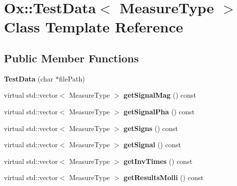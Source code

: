 \hypertarget{class_ox_1_1_test_data}{\section{Ox\-:\-:Test\-Data$<$ Measure\-Type $>$ Class Template Reference}
\label{class_ox_1_1_test_data}
}
\subsection*{Public Member Functions}
\begin{DoxyCompactItemize}
\item 
\hypertarget{class_ox_1_1_test_data_add19d13b8ec2404fc5d6ebf4ee79a231}{{\bfseries Test\-Data} (char $\ast$file\-Path)}\label{class_ox_1_1_test_data_add19d13b8ec2404fc5d6ebf4ee79a231}

\item 
\hypertarget{class_ox_1_1_test_data_a4e75699c035937ff96fa131505870208}{virtual std\-::vector$<$ Measure\-Type $>$ {\bfseries get\-Signal\-Mag} () const }\label{class_ox_1_1_test_data_a4e75699c035937ff96fa131505870208}

\item 
\hypertarget{class_ox_1_1_test_data_a287f28ddb03f9acc694528441b57c375}{virtual std\-::vector$<$ Measure\-Type $>$ {\bfseries get\-Signal\-Pha} () const }\label{class_ox_1_1_test_data_a287f28ddb03f9acc694528441b57c375}

\item 
\hypertarget{class_ox_1_1_test_data_a414b631b105104920740e51dcc4a3948}{virtual std\-::vector$<$ Measure\-Type $>$ {\bfseries get\-Signs} () const }\label{class_ox_1_1_test_data_a414b631b105104920740e51dcc4a3948}

\item 
\hypertarget{class_ox_1_1_test_data_a0dafaca55a2c3d57ff2106b518b3fada}{virtual std\-::vector$<$ Measure\-Type $>$ {\bfseries get\-Signal} () const }\label{class_ox_1_1_test_data_a0dafaca55a2c3d57ff2106b518b3fada}

\item 
\hypertarget{class_ox_1_1_test_data_acec1269baa03bfa45845f94f3bc15abe}{virtual std\-::vector$<$ Measure\-Type $>$ {\bfseries get\-Inv\-Times} () const }\label{class_ox_1_1_test_data_acec1269baa03bfa45845f94f3bc15abe}

\item 
\hypertarget{class_ox_1_1_test_data_a68a2cefeed3da1c1dac7a34256b9d640}{virtual std\-::vector$<$ Measure\-Type $>$ {\bfseries get\-Results\-Molli} () const }\label{class_ox_1_1_test_data_a68a2cefeed3da1c1dac7a34256b9d640}


\end{DoxyCompactItemize}

